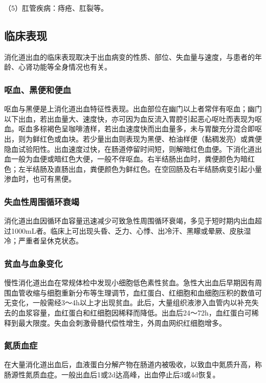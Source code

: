 （5）肛管疾病：痔疮、肛裂等。

\subsection{临床表现}

消化道出血的临床表现取决于出血病变的性质、部位、失血量与速度，与患者的年龄、心肾功能等全身情况也有关。

\subsubsection{呕血、黑便和便血}

呕血与黑便是上消化道出血特征性表现。出血部位在幽门以上者常伴有呕血；幽门以下出血，若出血量大、速度快，亦可因为血反流入胃腔引起恶心呕吐而表现为呕血。呕血多棕褐色呈咖啡渣样，若出血速度快而出血量多，未与胃酸充分混合即呕出，则为鲜红色或血块。若少量出血则表现为黑便、柏油样便（黏稠发亮）或粪便隐血试验阳性。出血速度过快，在肠道停留时间短，则解暗红色血便。下消化道出血一般为血便或暗红色大便，一般不伴呕血。右半结肠出血时，粪便颜色为暗红色；左半结肠及直肠出血，粪便颜色为鲜红色。在空回肠及右半结肠病变引起小量渗血时，也可有黑便。

\subsubsection{失血性周围循环衰竭}

消化道出血因循环血容量迅速减少可致急性周围循环衰竭，多见于短时期内出血超过1000mL者。临床上可出现头昏、乏力、心悸、出冷汗、黑矇或晕厥、皮肤湿冷；严重者呈休克状态。

\subsubsection{贫血与血象变化}

慢性消化道出血在常规体检中发现小细胞低色素性贫血。急性大出血后早期因有周围血管收缩与细胞重新分布等生理调节，血红蛋白、红细胞和血细胞压积的数值可无变化，一般需经3～4h以上才出现贫血。此后，大量组织液渗入血管内以补充失去的血浆容量，血红蛋白和红细胞因稀释而降低。出血后24～72h，血红蛋白可稀释到最大限度。失血会刺激骨髓代偿性增生，外周血网织红细胞增多。

\subsubsection{氮质血症}

在大量消化道出血后，血液蛋白分解产物在肠道内被吸收，以致血中氮质升高，称肠源性氮质血症。一般出血后1或2d达高峰，出血停止后3或4d恢复。

